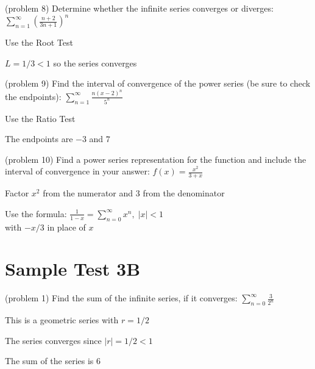 \documentclass[handout]{ximera}
\begin{document}
\begin{problem}(problem 8)
Determine whether the infinite series converges or diverges: $\displaystyle \sum_{n=1}^\infty \left(\frac{n+ 2}{3n+1}\right)^n$

\begin{hint}
Use the Root Test
\end{hint}

\begin{hint}
$L = 1/3 < 1$ so the series converges
\end{hint}

\end{problem}

\begin{problem} (problem 9)
Find the interval of convergence of the power series (be sure to check the endpoints):
$\displaystyle \sum_{n=1}^\infty \frac{n(x-2)^n}{5^n}$

\begin{hint}
Use the Ratio Test
\end{hint}
\begin{hint}
The endpoints are $-3$ and $7$
\end{hint}

\end{problem}


\begin{problem} (problem 10)
Find a power series representation for the function and include the interval of convergence in your answer:
$\displaystyle f(x) = \frac{x^2}{3 + x}$

\begin{hint}
Factor $x^2$ from the numerator and $3$ from the denominator
\end{hint}
\begin{hint}
Use the formula: $\displaystyle \frac{1}{1-x} = \sum_{n = 0}^\infty x^n, \; |x| <1$\\
with $-x/3$ in place of $x$
\end{hint}

\end{problem}


\section{Sample Test 3B}



\begin{problem}(problem 1)
Find the sum of the infinite series, if it converges: $\displaystyle \sum_{n=0}^\infty \frac{3}{2^n}$

\begin{hint}
This is a geometric series with $r = 1/2$
\end{hint}

\begin{hint}
The series converges since $|r| = 1/2 < 1$
\end{hint}

\begin{hint}
The sum of the series is 6
\end{hint}

\end{problem}
\end{document}
